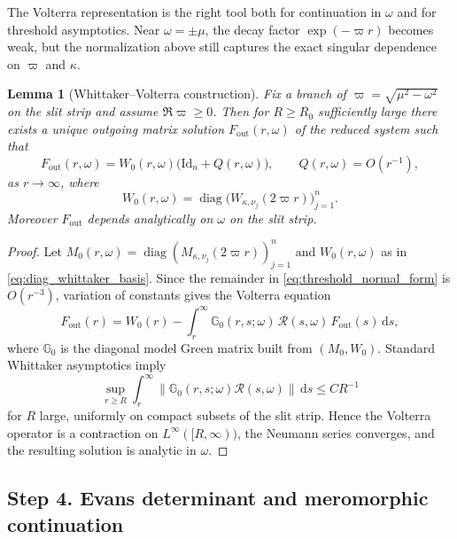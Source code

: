 \documentclass[12pt]{article}
\numberwithin{equation}{section}
\theoremstyle{plain}
\newtheorem{lemma}[theorem]{Lemma}
\theoremstyle{definition}
\theoremstyle{remark}
\newcommand{\dd}{\mathrm d}
\newcommand{\diag}{\operatorname{diag}}
\newcommand{\out}{\mathrm{out}}
\newcommand{\om}{\omega}
\newcommand{\vp}{\varpi}
\newcommand{\kap}{\kappa}
\newcommand{\norm}[1]{\left\|#1\right\|}
\newcommand{\Id}{\mathrm{Id}}
\begin{document}
The Volterra representation is the right tool both for continuation in $\om$ and for threshold asymptotics.  Near $\om=\pm\mu$, the decay factor $\exp(-\vp r)$ becomes weak, but the normalization above still captures the exact singular dependence on $\vp$ and $\kap$.


\begin{lemma}[Whittaker--Volterra construction]\label{lem:whittaker_volterra}
Fix a branch of $\vp=\sqrt{\mu^2-\om^2}$ on the slit strip and assume $\Re\vp\ge0$.  Then for $R\ge R_0$ sufficiently large there exists a unique outgoing matrix solution $F_{\out}(r,\om)$ of the reduced system such that
\begin{equation}\label{eq:outgoing_basis}
   F_{\out}(r,\om)
   =
   W_0(r,\om)\bigl(\Id_n+Q(r,\om)\bigr),
   \qquad
   Q(r,\om)=O(r^{-1}),
\end{equation}
as $r\to\infty$, where
\begin{equation}\label{eq:diag_whittaker_basis}
   W_0(r,\om)=\diag\bigl(W_{\kap,\nu_j}(2\vp r)\bigr)_{j=1}^n.
\end{equation}
Moreover $F_{\out}$ depends analytically on $\om$ on the slit strip.
\end{lemma}

\begin{proof}
Let $M_0(r,\om)=\diag(M_{\kap,\nu_j}(2\vp r))_{j=1}^n$ and $W_0(r,\om)$ as in \eqref{eq:diag_whittaker_basis}.  Since the remainder in \eqref{eq:threshold_normal_form} is $O(r^{-3})$, variation of constants gives the Volterra equation
\begin{equation}\label{eq:volterra_outgoing}
   F_{\out}(r)
   =
   W_0(r)
   -
   \int_r^\infty
   \mathbb G_0(r,s;\om)\,\mathcal R(s,\om)\,F_{\out}(s)\,\dd s,
\end{equation}
where $\mathbb G_0$ is the diagonal model Green matrix built from $(M_0,W_0)$.  Standard Whittaker asymptotics imply
\[
   \sup_{r\ge R}
   \int_r^\infty
   \norm{\mathbb G_0(r,s;\om)\mathcal R(s,\om)}\,\dd s
   \le CR^{-1}
\]
for $R$ large, uniformly on compact subsets of the slit strip.  Hence the Volterra operator is a contraction on $L^\infty([R,\infty))$, the Neumann series converges, and the resulting solution is analytic in $\om$.
\end{proof}

\subsection*{Step 4. Evans determinant and meromorphic continuation}
\end{document}
